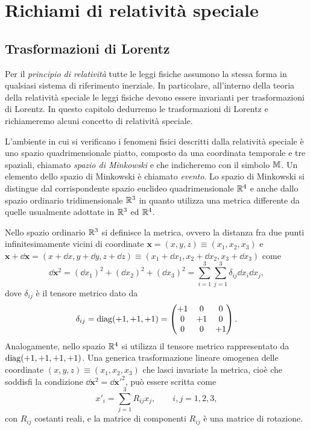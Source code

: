 \cleardoublepage
\chapter{Richiami di relatività speciale}
\label{cha:relativita-speciale}

\section{Trasformazioni di Lorentz}
\label{sec:trasformazioni-lorentz}

Per il \emph{principio di relatività} tutte le
leggi fisiche assumono la stessa forma in qualsiasi sistema di riferimento
inerziale.  In particolare, all'interno della teoria della relatività speciale
le leggi fisiche devono essere invarianti per trasformazioni di Lorentz.  In
questo capitolo dedurremo le trasformazioni di Lorentz e richiameremo alcuni
concetto di relatività speciale.

L'ambiente in cui si verificano i fenomeni fisici descritti dalla relatività
speciale è uno spazio quadrimensionale piatto, composto da una coordinata
temporale e tre spaziali, chiamato \emph{spazio
  di Minkowski}
e che indicheremo con il simbolo $\mathbb{M}$.  Un elemento dello spazio di Minkowski è
chiamato \emph{evento}.  Lo spazio di Minkowski si distingue dal
corrispondente spazio euclideo quadrimensionale $\mathbb{R}^{4}$ e anche dallo spazio
ordinario tridimensionale $\mathbb{R}^{3}$ in quanto utilizza una metrica differente da
quelle usualmente adottate in $\mathbb{R}^{3}$ ed $\mathbb{R}^{4}$.

Nello spazio ordinario $\mathbb{R}^{3}$ si definisce la metrica, ovvero la distanza fra
due punti infinitesimamente vicini di coordinate
$\bm{x} = (x,y,z) \equiv (x_{1},x_{2},x_{3})$ e
$\bm{x} + \dd \bm{x} = (x+\dd x,y+\dd y,z+\dd z) \equiv (x_{1}+\dd
x_{1},x_{2}+\dd x_{2},x_{3}+\dd x_{3})$ come
\begin{equation}
  \dd\bm{x}^{2} = (\dd x_{1})^{2} + (\dd x_{2})^{2} + (\dd x_{3})^{2} =
  \sum_{i=1}^{3} \sum_{j=1}^{3} \delta_{ij} \dd x_{i} \dd x_{j},
\end{equation}
dove $\delta_{ij}$ è il tensore metrico dato da
\begin{equation}
  \delta_{ij} = \operatorname{diag} (+1,+1,+1) =
  \begin{pmatrix}
    +1 & 0  & 0  \\
    0  & +1 & 0  \\
    0  & 0  & +1
  \end{pmatrix}.
\end{equation}
Analogamente, nello spazio $\mathbb{R}^{4}$ si utilizza il tensore metrico rappresentato
da $\operatorname{diag} (+1,+1,+1,+1)$.  Una generica trasformazione lineare omogenea delle
coordinate $(x,y,z) \equiv (x_{1},x_{2},x_{3})$ che lasci invariate la metrica,
cioè che soddisfi la condizione $\dd\bm{x}^{2} = \dd\bm{x}'^{2}$, può essere
scritta
come
\begin{equation}
  x'_{i} = \sum_{j=1}^{3} R_{ij}x_{j}, \qquad i,j = 1,2,3,
\end{equation}
con $R_{ij}$ costanti reali, e la matrice di componenti $R_{ij}$ è una matrice
di rotazione.

